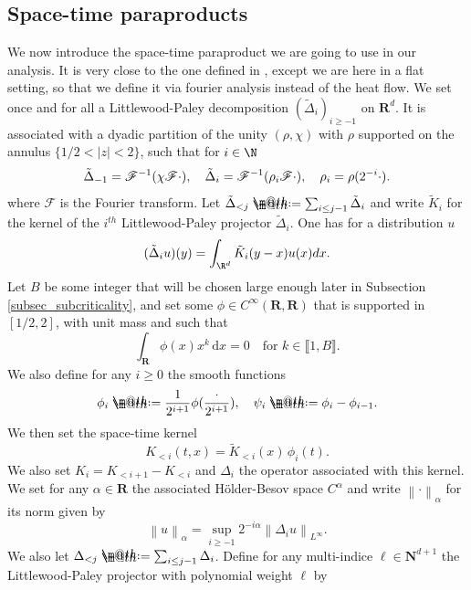 \documentclass[11pt]{preprint}
\makeatletter
\newcommand*{\defeq}{\mathrel{\rlap{%
			\raisebox{0.3ex}{$\m@th\cdot$}}%
		\raisebox{-0.3ex}{$\m@th\cdot$}}%
	=}
\newcommand{\bfN}{\mathbf{N}}
\newcommand{\bfR}{\mathbf{R}}
\newcommand{\norme}[1]{\left\lVert #1 \right\lVert}
\newcommand{\bbrack}[1]{ \llbracket #1 \rrbracket }
\newcommand{\ddd}{ \text{d} }
\makeatother
\begin{document}
	\subsection{Space-time paraproducts}\label{subsect_spacetime_paraproduct}
	We now introduce the space-time paraproduct we are going to use in our analysis. It is very close to the one defined in \cite{SpacetimeParaproducts}, except we are here in a flat setting, so that we define it via fourier analysis instead of the heat flow. We set once and for all a Littlewood-Paley decomposition $(\tilde{\Delta}_i)_{i\geq -1}$ on $\bfR^d$. It is associated with a dyadic partition of the unity $(\rho, \chi)$ with $\rho$ supported on the annulus $\{ 1/2<|z|<2 \}$, such that for $ i \in \N $
	\begin{equation*}
		\tilde{\Delta}_{\tiny{-1}} = \mathscr{F}^{-1}( \chi \mathscr{F} \cdot ), \quad \tilde{\Delta}_{i} = \mathscr{F}^{-1}( \rho_i \mathscr{F} \cdot ), \quad \rho_i = \rho(2^{-i} \cdot).
	\end{equation*}
	where $ \mathscr{F} $ is the Fourier transform.
	Let $ \tilde{\Delta}_{<j} \defeq \sum_{i\leq j-1}\tilde{\Delta}_i$ and write $\tilde{K}_i$ for the kernel of the $i^{th}$ Littlewood-Paley projector $\tilde{\Delta}_i$. One has for a distribution $ u $
	\begin{equation*}
		(\tilde{\Delta}_i u)(y) = \int_{\R^d} \tilde{K}_i(y-x) u(x) dx.
	\end{equation*}
	Let $B$ be some integer that will be chosen large enough later in Subsection \ref{subsec_subcriticality}, and set some $\phi\in C^\infty(\bfR,\bfR)$ that is supported in $[1/2,2]$, with unit mass and such that
	\begin{equation}
		\int_\bfR \phi(x)x^k \, \ddd x = 0  \quad \text{for } k\in\bbrack{1,B}.
	\end{equation}
	We also define for any $i\geq0$ the smooth functions $$\phi_i \defeq \frac{1}{2^{i+1}} \phi(\frac{\cdot}{2^{i+1}}), \quad \psi_i \defeq  \phi_i-\phi_{i-1}.$$
	We then set the space-time kernel 
	\begin{equation}
		K_{<i}(t,x) = \tilde{K}_{<i}(x) \, \phi_i(t).
	\end{equation}  
	We also set $K_i = K_{<i+1} - K_{<i}$ and $\Delta_{i}$ the operator associated with this kernel.
We set for any $\alpha\in\bfR$ the associated Hölder-Besov space $C^\alpha$ and write $\norme{\cdot}_\alpha$ for its norm given by
	$$
	\norme{u}_\alpha = \sup_{i\geq-1}2^{-i\alpha} \norme{\Delta_i u}_{L^\infty}.
	$$ 
	We also let $ \Delta_{<j} \defeq \sum_{i\leq j-1}\Delta_i$. Define for any multi-indice $\ell \in \bfN^{d+1}$ the Littlewood-Paley projector with polynomial weight $\ell$ by 
\end{document}
